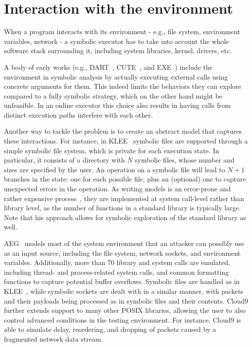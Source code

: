 
\section{Interaction with the environment}

When a program interacts with its environment - e.g., file system, environment variables, network - a symbolic executor has to take into account the whole software stack surrounding it, including system libraries, kernel, drivers, etc.

A body of early works (e.g., {\sc DART}~\cite{DART-PLDI05}, {\sc CUTE}~\cite{CUTE-FSE13}, and {\sc EXE}~\cite{EXE-CCS06}) include the environment in symbolic analysis by actually executing external calls using concrete arguments for them. This indeed limits the behaviors they can explore compared to a fully symbolic strategy, which on the other hand might be unfeasible. In an online executor this choice also results in having calls from distinct execution paths interfere with each other. 

Another way to tackle the problem is to create an abstract model that captures these interactions. For instance, in {\sc KLEE}~\cite{KLEE-OSDI08} symbolic files are supported through a simple symbolic file system, which is private for each execution state. In particular, it consists of a directory with $N$ symbolic files, whose number and sizes are specified by the user. An operation on a symbolic file will lead to $N+1$ branches in the state: one for each possible file, plus an (optional) one to capture unexpected errors in the operation. As writing models is an error-prone and rather expensive process~\cite{Ball06}, they are implemented at system call-level rather than library level, as the number of functions in a standard library  is typically large. Note that his approach allows for symbolic exploration of the standard library as well.

{\sc AEG}~\cite{AEG-NDSS11} models most of the system environment that an attacker can possibly use as an input source, including the file system, network sockets, and environment variables. Additionally, more than 70 library and system calls are emulated, including thread- and process-related system calls, and common formatting functions to capture potential buffer overflows. Symbolic files are handled as in {\sc KLEE}~\cite{KLEE-OSDI08}, while symbolic sockets are dealt with in a similar manner, with packets and their payloads being processed as in symbolic files and their contents. {\sc Cloud9} further extends support to many other POSIX libraries, allowing the user to also control advanced conditions in the testing environment. For instance,  {\sc Cloud9} is able to simulate delay, reordering, and dropping of packets caused by a fragmented network data stream.

